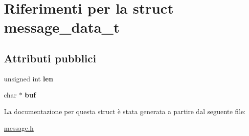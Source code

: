 \hypertarget{structmessage__data__t}{}\section{Riferimenti per la struct message\+\_\+data\+\_\+t}
\label{structmessage__data__t}
\subsection*{Attributi pubblici}
\begin{DoxyCompactItemize}
\item 
unsigned int {\bfseries len}\hypertarget{structmessage__data__t_a0f25429844cd856204c21329ff689566}{}\label{structmessage__data__t_a0f25429844cd856204c21329ff689566}

\item 
char $\ast$ {\bfseries buf}\hypertarget{structmessage__data__t_aba52694fd59a6cf8227b84b3cd1c30dd}{}\label{structmessage__data__t_aba52694fd59a6cf8227b84b3cd1c30dd}

\end{DoxyCompactItemize}


La documentazione per questa struct è stata generata a partire dal seguente file\+:\begin{DoxyCompactItemize}
\item 
\hyperlink{message_8h}{message.\+h}\end{DoxyCompactItemize}
